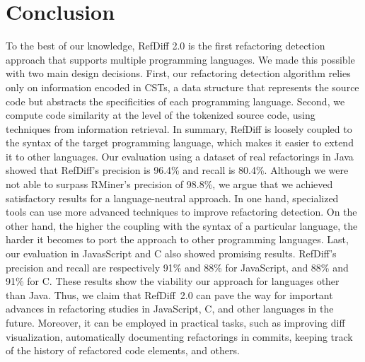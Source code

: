\section{Conclusion}
\label{SecConclusion}



To the best of our knowledge, RefDiff 2.0 is the first refactoring detection approach that supports multiple programming languages.
We made this possible with two main design decisions. First, our refactoring detection algorithm relies only on information encoded in CSTs, a data structure that represents the source code but abstracts the specificities of each programming language.
Second, we compute code similarity at the level of the tokenized source code, using techniques from information retrieval.
In summary, RefDiff is loosely coupled to the syntax of the target programming language, which makes it easier to extend it to other languages.
Our evaluation using a dataset of real refactorings in Java showed that RefDiff's precision is 96.4\% and recall is 80.4\%.
Although we were not able to surpass RMiner's precision of 98.8\%, we argue that we achieved satisfactory results for a language-neutral approach.
In one hand, specialized tools can use more advanced techniques to improve refactoring detection.
On the other hand, the higher the coupling with the syntax of a particular language, the harder it becomes to port the approach to other programming languages.
Last, our evaluation in JavasScript and C also showed promising results. RefDiff's precision and recall are respectively 91\% and 88\% for JavaScript, and 88\% and 91\% for C.
These results show the viability our approach for languages other than Java.
Thus, we claim that RefDiff~2.0 can pave the way for important advances in refactoring studies in JavaScript, C, and other languages in the future.
Moreover, it can be employed in practical tasks, such as improving diff visualization, automatically documenting refactorings in commits, keeping track of the history of refactored code elements, and others.
